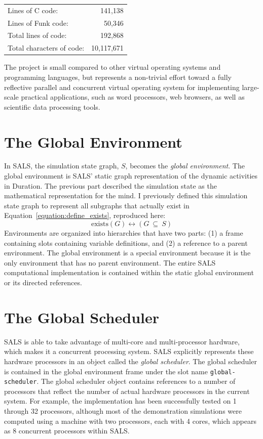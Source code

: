 \vspace{5mm}
\begin{tabular}{lr}
Lines of C code:             &    141,138 \\
Lines of Funk code:          &     50,346 \\
Total lines of code:         &    192,868 \\
Total characters of code:    & 10,117,671
\end{tabular}
\vspace{5mm}

The project is small compared to other virtual operating systems and
programming languages, but represents a non-trivial effort toward a
fully reflective parallel and concurrent virtual operating system for
implementing large-scale practical applications, such as word
processors, web browsers, as well as scientific data processing tools.

\section{The Global Environment}

In SALS, the simulation state graph, $S$, becomes the \emph{global
  environment}.  The global environment is SALS' static graph
representation of the dynamic activities in Duration.  The previous
part described the simulation state as the mathematical representation
for the mind.  I previously defined this simulation state graph to
represent all subgraphs that actually exist in
Equation\ \ref{equation:define_exists}, reproduced here:
\begin{equation*}
\text{exists}(G) \longleftrightarrow (G ~{\subseteq}~ S)
\end{equation*}
Environments are organized into hierarchies that have two parts: (1) a
frame containing slots containing variable definitions, and (2) a
reference to a parent environment.  The global environment is a
special environment because it is the only environment that has no
parent environment.  The entire SALS computational implementation is
contained within the static global environment or its directed
references.

\section{The Global Scheduler}

SALS is able to take advantage of multi-core and multi-processor
hardware, which makes it a concurrent processing system.  SALS
explicitly represents these hardware processors in an object called
the \emph{global scheduler}.  The global scheduler is contained in the
global environment frame under the slot name {\tt global-scheduler}.
The global scheduler object contains references to a number of
processors that reflect the number of actual hardware processors in
the current system.  For example, the implementation has been
successfully tested on 1 through 32 processors, although most of the
demonstration simulations were computed using a machine with two
processors, each with 4 cores, which appears as 8 concurrent
processors within SALS.

